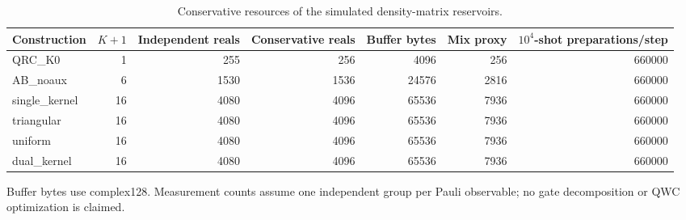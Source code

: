 \begin{table}[t]
\caption{Conservative resources of the simulated density-matrix reservoirs.}
\label{tab:physical_resources}
\begin{ruledtabular}
\begin{tabular}{lrrrrrr}
Construction & $K{+}1$ & Independent reals & Conservative reals & Buffer bytes & Mix proxy & $10^4$-shot preparations/step \\
\hline
QRC\_K0 & 1 & 255 & 256 & 4096 & 256 & 660000 \\
AB\_noaux & 6 & 1530 & 1536 & 24576 & 2816 & 660000 \\
single\_kernel & 16 & 4080 & 4096 & 65536 & 7936 & 660000 \\
triangular & 16 & 4080 & 4096 & 65536 & 7936 & 660000 \\
uniform & 16 & 4080 & 4096 & 65536 & 7936 & 660000 \\
dual\_kernel & 16 & 4080 & 4096 & 65536 & 7936 & 660000 \\
\end{tabular}
\end{ruledtabular}
\begin{flushleft}\footnotesize Buffer bytes use complex128. Measurement counts assume one independent group per Pauli observable; no gate decomposition or QWC optimization is claimed.\end{flushleft}
\end{table}
